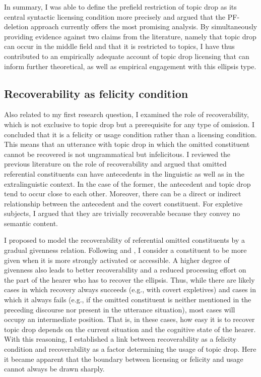 In summary, I was able to define the prefield restriction of topic drop as its central syntactic licensing condition more precisely and argued that the PF-deletion approach  currently offers the most promising analysis.
By simultaneously providing evidence against two claims from the literature, namely that topic drop can occur in the middle field  and that it is restricted to topics, I have thus contributed to an empirically adequate account of topic drop licensing that can inform further theoretical, as well as empirical engagement with this ellipsis type.

\subsection{Recoverability as felicity condition}
Also related to my first research question, I examined the role of recoverability, which is not exclusive to topic drop but a prerequisite for any type of omission.
I concluded that it is a felicity or usage condition rather than a licensing condition. 
This means that an utterance with topic drop in which the omitted constituent cannot be recovered is not ungrammatical but infelicitous.
I reviewed the previous literature on the role of recoverability and argued that omitted referential constituents can have antecedents  in the linguistic as well as in the extralinguistic context. 
In the case of the former, the antecedent  and topic drop tend to occur close to each other.
Moreover, there can be a direct or indirect relationship between the antecedent and the covert constituent.
For expletive  subjects, I argued that they are trivially recoverable because they convey no semantic content.

I proposed to model the recoverability of referential omitted constituents by a gradual givenness relation.
Following \citet{chafe1994} and \citet{ariel1990}, I consider a constituent to be more given  when it is more strongly activated or accessible.
A higher degree of givenness also leads to better recoverability and a reduced processing effort  on the part of the hearer who has to recover the ellipsis.
Thus, while there are likely cases in which recovery always succeeds (e.g., with covert expletives)  and cases in which it always fails (e.g., if the omitted constituent is neither mentioned in the preceding discourse nor present in the utterance situation), most cases will occupy an intermediate position.
That is, in these cases, how easy it is to recover topic drop depends on the current situation and the cognitive state of the hearer.
With this reasoning, I established a link between recoverability as a felicity condition and recoverability as a factor determining the usage of topic drop.
Here it became apparent that the boundary between licensing or felicity and usage cannot always be drawn sharply.

